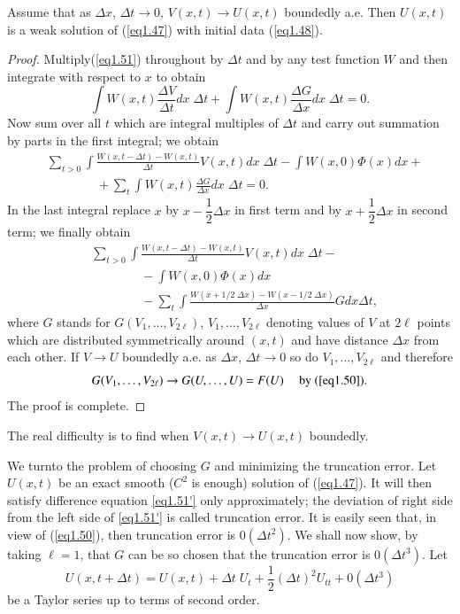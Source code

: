 \begin{theorem*}
Assume that as $\Delta x$, $\Delta t \to 0$, $V(x,t) \to U(x,t)$ boundedly a.e. Then $U(x,t)$ is a weak solution of (\ref{eq1.47}) with initial data (\ref{eq1.48}).
\end{theorem*}

\begin{proof}
Multiply\pageoriginale (\ref{eq1.51}) throughout by $\Delta t$ and by any test function $W$ and then integrate with respect to $x$ to obtain
$$
\int W(x,t) \frac{\Delta V}{\Delta t} dx \; \Delta t + \int W(x,t) \frac{\Delta G}{\Delta x} dx \; \Delta t = 0. 
$$
Now sum over all $t$ which are integral multiples of $\Delta t$ and carry out summation by parts in the first integral; we obtain
\begin{align*}
& \sum\limits_{t >0} \int \frac{W(x,t - \Delta t) - W(x,t)}{\Delta t} V (x,t) dx \; \Delta t - \int W (x,0) \Phi (x) dx + \\
& \qquad \qquad  + \sum\limits_t \int  W (x,t) \frac{\Delta G}{\Delta x} dx \; \Delta t = 0.
\end{align*}
In the last integral replace $x$ by $x- \dfrac{1}{2} \Delta x$ in first term and by $x + \dfrac{1}{2} \Delta x$ in second term; we finally obtain 
\begin{align*}
& \sum\limits_{t>0} \int \frac{W(x,t - \Delta t) - W(x,t)}{\Delta t} V(x,t) dx \; \Delta t - \\
& \qquad \qquad - \int  W (x,0) \Phi  (x) dx\\
&\qquad\qquad - \sum\limits_t \int \frac{W(x+1/2 \; \Delta x) - W(x - 1/2 \; \Delta x) }{\Delta x} G d x \Delta t, 
\end{align*}
where $G$ stands for $G(V_1, \ldots , V_{2\ell})$, $V_1, \ldots, V_{2\ell}$ denoting values of $V$ at $2\ell$ points which are distributed symmetrically around $(x,t)$ and have distance $\Delta x$ from each other. If $V \to U$ boundedly a.e. as $\Delta x$, $\Delta t \to 0$ so do $V_1, \ldots, V_{2\ell}$ and therefore
$$
G(V_1, \ldots , V_{2\ell}) \to G(U, \ldots , U) = F(U) \quad \text{ by (\ref{eq1.50}).}
$$
The proof is complete.
\end{proof}

The real difficulty is to find when $V(x,t) \to U (x,t)$ boundedly.

We turn\pageoriginale to the problem of choosing $G$ and minimizing the truncation error. Let $U(x,t)$ be an exact smooth ($C^2$ is enough) solution of (\ref{eq1.47}). It will then satisfy difference equation \ref{eq1.51'} only approximately; the deviation of right side from the left side of \ref{eq1.51'} is called truncation error. It is easily seen that, in view of (\ref{eq1.50}), then truncation error is $0(\Delta t^2)$. We shall now show, by taking $\ell =1$, that $G$ can be so chosen that the truncation error is $0(\Delta t^3)$. Let
\begin{equation*}
U(x,t + \Delta t) = U (x,t) + \Delta t \; U_t + \frac{1}{2} (\Delta t)^2 U_{tt} + 0 (\Delta t^3)\tag{1.52}\label{eq1.52}
\end{equation*}
be a Taylor series up to terms of second order.

